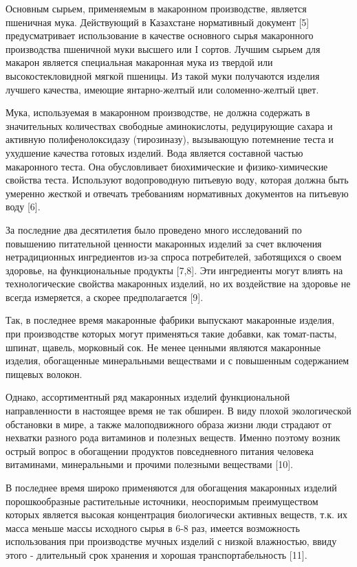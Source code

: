 Основным сырьем, применяемым в макаронном производстве, является
пшеничная мука. Действующий в Казахстане нормативный документ {[}5{]}
предусматривает использование в качестве основного сырья макаронного
производства пшеничной муки высшего или I сортов. Лучшим сырьем для
макарон является специальная макаронная мука из твердой или
высокостекловидной мягкой пшеницы. Из такой муки получаются изделия
лучшего качества, имеющие янтарно-желтый или соломенно-желтый цвет.

Мука, используемая в макаронном производстве, не должна содержать в
значительных количествах свободные аминокислоты, редуцирующие сахара и
активную полифенолоксидазу (тирозиназу), вызывающую потемнение теста и
ухудшение качества готовых изделий. Вода является составной частью
макаронного теста. Она обусловливает биохимические и физико-химические
свойства теста. Используют водопроводную питьевую воду, которая должна
быть умеренно жесткой и отвечать требованиям нормативных документов на
питьевую воду {[}6{]}.

За последние два десятилетия было проведено много исследований по
повышению питательной ценности макаронных изделий за счет включения
нетрадиционных ингредиентов из-за спроса потребителей, заботящихся о
своем здоровье, на функциональные продукты {[}7,8{]}. Эти ингредиенты
могут влиять на технологические свойства макаронных изделий, но их
воздействие на здоровье не всегда измеряется, а скорее предполагается
{[}9{]}.

Так, в последнее время макаронные фабрики выпускают макаронные изделия,
при производстве которых могут применяться такие добавки, как
томат-пасты, шпинат, щавель, морковный сок. Не менее ценными являются
макаронные изделия, обогащенные минеральными веществами и с повышенным
содержанием пищевых волокон.

Однако, ассортиментный ряд макаронных изделий функциональной
направленности в настоящее время не так обширен. В виду плохой
экологической обстановки в мире, а также малоподвижного образа жизни
люди страдают от нехватки разного рода витаминов и полезных веществ.
Именно поэтому возник острый вопрос в обогащении продуктов повседневного
питания человека витаминами, минеральными и прочими полезными веществами
{[}10{]}.

В последнее время широко применяются для обогащения макаронных изделий
порошкообразные растительные источники, неоспоримым преимуществом
которых является высокая концентрация биологически активных веществ,
т.к. их масса меньше массы исходного сырья в 6-8 раз, имеется
возможность использования при производстве мучных изделий с низкой
влажностью, ввиду этого - длительный срок хранения и хорошая
транспортабельность {[}11{]}.

